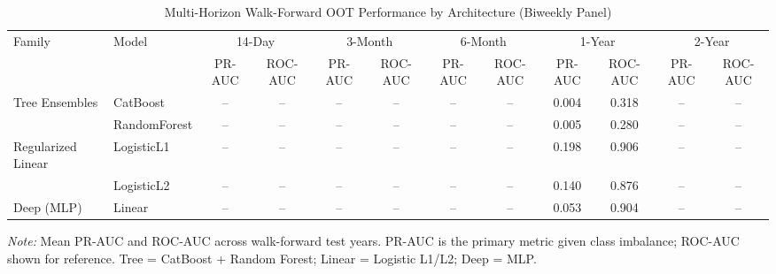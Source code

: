 \begin{table}[H]
\centering
\small
\setlength{\tabcolsep}{4pt}
\caption[Multi-Horizon OOT Performance by Architecture]{Multi-Horizon Walk-Forward OOT Performance by Architecture (Biweekly Panel)}
\label{tbl:multihorizon_biweekly}
\begin{tabular}{llcccccccccc}
\toprule
Family & Model & \multicolumn{2}{c}{14-Day} & \multicolumn{2}{c}{3-Month} & \multicolumn{2}{c}{6-Month} & \multicolumn{2}{c}{1-Year} & \multicolumn{2}{c}{2-Year} \\
\cmidrule(lr){3-4}\cmidrule(lr){5-6}\cmidrule(lr){7-8}\cmidrule(lr){9-10}\cmidrule(lr){11-12}
 &  & PR-AUC & ROC-AUC & PR-AUC & ROC-AUC & PR-AUC & ROC-AUC & PR-AUC & ROC-AUC & PR-AUC & ROC-AUC \\
\midrule
Tree Ensembles & CatBoost & -- & -- & -- & -- & -- & -- & 0.004 & 0.318 & -- & -- \\
 & RandomForest & -- & -- & -- & -- & -- & -- & 0.005 & 0.280 & -- & -- \\
\midrule
Regularized Linear & LogisticL1 & -- & -- & -- & -- & -- & -- & 0.198 & 0.906 & -- & -- \\
 & LogisticL2 & -- & -- & -- & -- & -- & -- & 0.140 & 0.876 & -- & -- \\
\midrule
Deep (MLP) & Linear & -- & -- & -- & -- & -- & -- & 0.053 & 0.904 & -- & -- \\
\midrule
\bottomrule
\end{tabular}
\begin{minipage}{\textwidth}
\vspace{2pt}\footnotesize
\textit{Note:} Mean PR-AUC and ROC-AUC across walk-forward test years. PR-AUC is the primary metric given class imbalance; ROC-AUC shown for reference. Tree = CatBoost + Random Forest; Linear = Logistic L1/L2; Deep = MLP. 
\end{minipage}
\end{table}